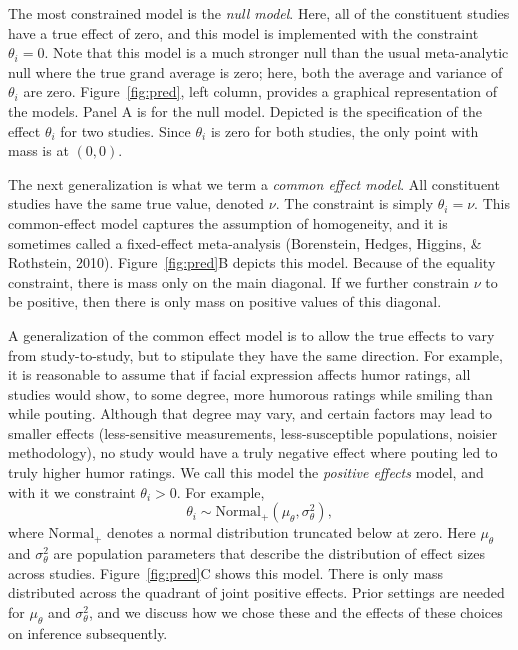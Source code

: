\documentclass[english,man]{apa6}
\theoremstyle{definition}
\theoremstyle{definition}
\theoremstyle{remark}
\begin{document}
The most constrained model is the \emph{null model}. Here, all of the
constituent studies have a true effect of zero, and this model is
implemented with the constraint \(\theta_i=0\). Note that this model is
a much stronger null than the usual meta-analytic null where the true
grand average is zero; here, both the average and variance of
\(\theta_i\) are zero. Figure~\ref{fig:pred}, left column, provides a
graphical representation of the models. Panel A is for the null model.
Depicted is the specification of the effect \(\theta_i\) for two
studies. Since \(\theta_i\) is zero for both studies, the only point
with mass is at \((0,0)\).

The next generalization is what we term a \emph{common effect model}.
All constituent studies have the same true value, denoted \(\nu\). The
constraint is simply \(\theta_i=\nu\). This common-effect model captures
the assumption of homogeneity, and it is sometimes called a fixed-effect
meta-analysis (Borenstein, Hedges, Higgins, \& Rothstein, 2010).
Figure~\ref{fig:pred}B depicts this model. Because of the equality
constraint, there is mass only on the main diagonal. If we further
constrain \(\nu\) to be positive, then there is only mass on positive
values of this diagonal.

A generalization of the common effect model is to allow the true effects
to vary from study-to-study, but to stipulate they have the same
direction. For example, it is reasonable to assume that if facial
expression affects humor ratings, all studies would show, to some
degree, more humorous ratings while smiling than while pouting. Although
that degree may vary, and certain factors may lead to smaller effects
(less-sensitive measurements, less-susceptible populations, noisier
methodology), no study would have a truly negative effect where pouting
led to truly higher humor ratings. We call this model the \emph{positive
effects} model, and with it we constraint \(\theta_i>0\). For example,
\[
\theta_i \sim \mbox{Normal}_+(\mu_\theta,\sigma^2_\theta),
\] where \(\mbox{Normal}_+\) denotes a normal distribution truncated
below at zero. Here \(\mu_\theta\) and \(\sigma^2_\theta\) are
population parameters that describe the distribution of effect sizes
across studies. Figure~\ref{fig:pred}C shows this model. There is only
mass distributed across the quadrant of joint positive effects. Prior
settings are needed for \(\mu_\theta\) and \(\sigma^2_\theta\), and we
discuss how we chose these and the effects of these choices on inference
subsequently.
\end{document}
